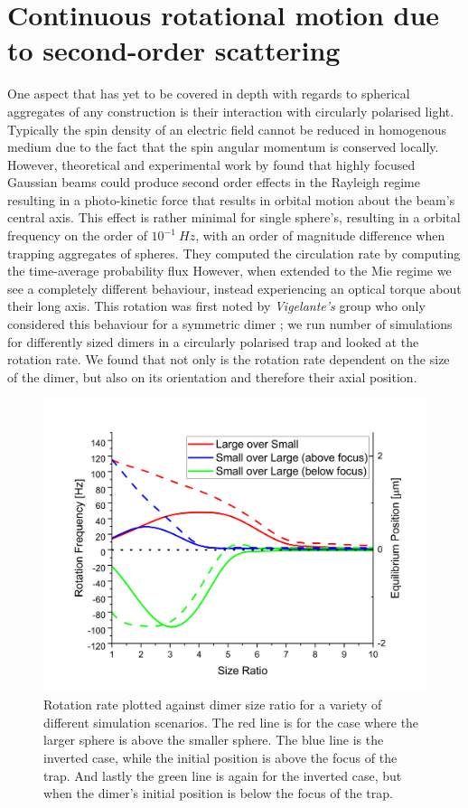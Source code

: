 \section{Continuous rotational motion due to second-order scattering}
One aspect that has yet to be covered in depth with regards to spherical aggregates of any construction is their interaction with circularly polarised light. Typically the spin density of an electric field cannot be reduced in homogenous medium due to the fact that the spin angular momentum is conserved locally. However, theoretical and experimental work by \cite{Yevick2017} found that highly focused Gaussian beams could produce second order effects in the Rayleigh regime resulting in a photo-kinetic force that results in orbital motion about the beam's central axis. This effect is rather minimal for single sphere's, resulting in a orbital frequency on the order of $10^{-1}\ Hz$, with an order of magnitude difference when trapping aggregates of spheres. They computed the circulation rate by computing the time-average probability flux However, when extended to the Mie regime we see a completely different behaviour, instead experiencing an optical torque about their long axis. This rotation was first noted by \textit{Vigelante's} group who only considered this behaviour for a symmetric dimer \cite{Vigilante2020}; we run number of simulations for differently sized dimers in a circularly polarised trap and looked at the rotation rate. We found that not only is the rotation rate dependent on the size of the dimer, but also on its orientation and therefore their axial position.

\begin{figure}[h]
	\centering
	\includegraphics[width=0.65\linewidth]{rotation_rate_vs_size.png}
	\caption{Rotation rate plotted against dimer size ratio for a variety of different simulation scenarios. The red line is for the case where the larger sphere is above the smaller sphere. The blue line is the inverted case, while the initial position is above the focus of the trap. And lastly the green line is again for the inverted case, but when the dimer's initial position is below the focus of the trap.}
\end{figure}

